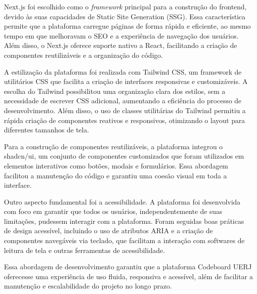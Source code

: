 Next.js foi escolhido como o \emph{framework} principal para a construção do frontend, devido às suas capacidades de Static Site Generation (SSG). Essa característica permite que a plataforma carregue páginas de forma rápida e eficiente, ao mesmo tempo em que melhoravam o SEO e a experiência de navegação dos usuários. Além disso, o Next.js oferece suporte nativo a React, facilitando a criação de componentes reutilizáveis e a organização do código.

A estilização da plataforma foi realizada com Tailwind CSS, um framework de utilitários CSS que facilita a criação de interfaces responsivas e customizáveis. A escolha do Tailwind possibilitou uma organização clara dos estilos, sem a necessidade de escrever CSS adicional, aumentando a eficiência do processo de desenvolvimento. Além disso, o uso de classes utilitárias do Tailwind permitiu a rápida criação de componentes reativos e responsivos, otimizando o layout para diferentes tamanhos de tela.

Para a construção de componentes reutilizáveis, a plataforma integrou o shadcn/ui, um conjunto de componentes customizados que foram utilizados em elementos interativos como botões, modais e formulários. Essa abordagem facilitou a manutenção do código e garantiu uma coesão visual em toda a interface.

Outro aspecto fundamental foi a acessibilidade. A plataforma foi desenvolvida com foco em garantir que todos os usuários, independentemente de suas limitações, pudessem interagir com a plataforma. Foram seguidas boas práticas de design acessível, incluindo o uso de atributos ARIA e a criação de componentes navegáveis via teclado, que facilitam a interação com softwares de leitura de tela e outras ferramentas de acessibilidade.

Essa abordagem de desenvolvimento garantiu que a plataforma Codeboard UERJ oferecesse uma experiência de uso fluida, responsiva e acessível, além de facilitar a manutenção e escalabilidade do projeto no longo prazo.

